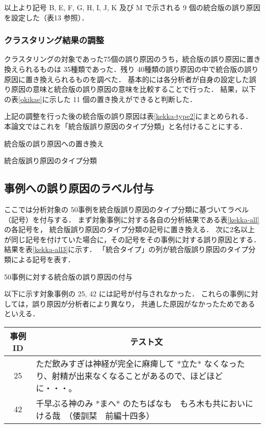 \documentclass[japanese]{jnlp_1.4}
\begin{document}
以上より記号 B, E, F, G, H, I, J, K 及び M で示される 9 個の統合版の誤り原因を設定した（表13 参照）．


\subsubsection{クラスタリング結果の調整}

クラスタリングの対象であった75個の誤り原因のうち，統合版の誤り原因に置き換えられるものは
35種類であった．残り 40種類の誤り原因の中で統合版の誤り原因に置き換えられるものを調べた．
基本的には各分析者が自身の設定した誤り原因の意味と統合版の誤り原因の意味を比較することで行った．
結果，以下の\mbox{表\ref{okikae}}に示した 11 個の置き換えができると判断した．

上記の調整を行った後の統合版の誤り原因は\mbox{表\ref{kekka-type2}}にまとめられる．
本論文ではこれを「統合版誤り原因のタイプ分類」と名付けることにする．

\begin{table}[t]
\caption{統合版の誤り原因への置き換え}
\label{okikae}

\end{table}
\begin{table}[t]
\caption{統合版誤り原因のタイプ分類}
\label{kekka-type2}

\end{table}



\subsection{事例への誤り原因のラベル付与}

ここでは分析対象の 50事例を統合版誤り原因のタイプ分類に基づいてラベル（記号）を付与する．
まず対象事例に対する各自の分析結果である\mbox{表\ref{kekka-all}}の各記号を，
統合版誤り原因のタイプ分類の記号に置き換える．
次に2名以上が同じ記号を付けていた場合に，その記号をその事例に対する誤り原因とする．
結果を\mbox{表\ref{kekka-all3}}に示す．
「統合タイプ」の列が統合版誤り原因のタイプ分類による記号を表す．

\begin{table}[p]
\caption{50事例に対する統合版の誤り原因の付与}
\label{kekka-all3}

\end{table}

以下に示す対象事例の 25, 42 には記号が付与されなかった．
これらの事例に対しては，誤り原因が分析者により異なり，
共通した原因がなかったためであるといえる．

\vspace{0.5\Cvs}
\begin{center}
\small
\begin{tabular}{c|p{364pt}}
\hline
事例 ID & \multicolumn{1}{c}{テスト文} \\
\hline
25	& ただ飲みすぎは神経が完全に麻痺して *立た* なくなったり、射精が出来なくなることがあるので、ほどほどに・・・。  \\
\hline
42	& 千早ぶる神のみ *まへ* のたちばなも　もろ木も共においにける哉　（倭訓栞　前編十四多）  \\
\hline
\end{tabular}
\end{center}
\vspace{0.5\Cvs}
\end{document}
